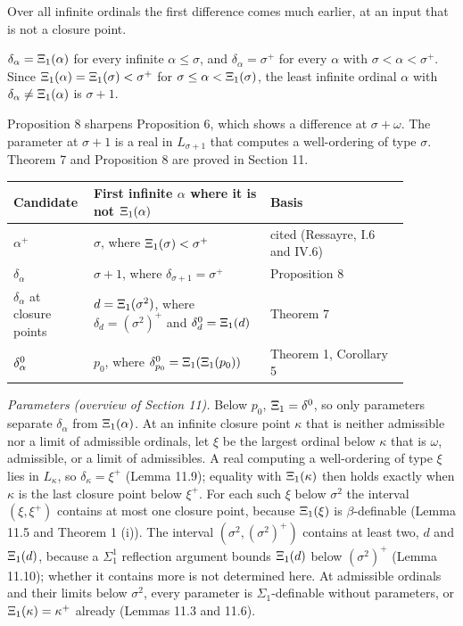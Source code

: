 \documentclass[11pt]{article}
\begin{document}
Over all infinite ordinals the first difference comes much earlier, at an input that is not a closure point.

\begin{statement} $\delta_{\alpha} = \Xi_1(\alpha)$ for every infinite $\alpha \le \sigma$, and
$\delta_{\alpha} = \sigma^+$ for every $\alpha$ with $\sigma < \alpha < \sigma^+$. Since
$\Xi_1(\alpha) = \Xi_1(\sigma) < \sigma^+$ for $\sigma \le \alpha < \Xi_1(\sigma)$, the least infinite ordinal $\alpha$
with $\delta_{\alpha} \ne \Xi_1(\alpha)$ is $\sigma + 1$.
\end{statement}

Proposition 8 sharpens Proposition 6, which shows a difference at $\sigma + \omega$. The parameter at $\sigma + 1$
is a real in $L_{\sigma + 1}$ that computes a well-ordering of type $\sigma$. Theorem 7 and Proposition 8 are
proved in Section 11.
\begin{center}\begin{tabular}{p{0.13\linewidth}p{0.42\linewidth}p{0.33\linewidth}}
\toprule
Candidate & First infinite $\alpha$ where it is not $\Xi_1(\alpha)$ & Basis \\
\midrule
$\alpha^+$ & $\sigma$, where $\Xi_1(\sigma) < \sigma^+$ & cited (Ressayre, I.6 and IV.6) \\
$\delta_{\alpha}$ & $\sigma + 1$, where $\delta_{\sigma+1} = \sigma^+$ & Proposition 8 \\
$\delta_{\alpha}$ at closure points & $d = \Xi_1(\sigma^2)$, where $\delta_d = (\sigma^2)^+$ and $\delta^0_{d} = \Xi_1(d)$ & Theorem 7 \\
$\delta^0_{\alpha}$ & $p_0$, where $\delta^0_{p_0} = \Xi_1(\Xi_1(p_0))$ & Theorem 1, Corollary 5 \\
\bottomrule
\end{tabular}\end{center}

\emph{Parameters (overview of Section 11).} Below $p_0$, $\Xi_1 = \delta^0_{}$, so only parameters separate $\delta_{\alpha}$ from $\Xi_1(\alpha)$.
At an infinite closure point $\kappa$ that is neither admissible nor a limit of admissible ordinals, let $\xi$ be
the largest ordinal below $\kappa$ that is $\omega$, admissible, or a limit of admissibles. A real computing a
well-ordering of type $\xi$ lies in $L_{\kappa}$, so $\delta_{\kappa} = \xi^+$ (Lemma 11.9); equality with
$\Xi_1(\kappa)$ then holds exactly when $\kappa$ is the last closure point below $\xi^+$. For each such $\xi$ below
$\sigma^2$ the interval $(\xi, \xi^+)$ contains at most one closure point, because $\Xi_1(\xi)$ is
$\beta$-definable (Lemma 11.5 and Theorem 1 (i)). The interval $(\sigma^2, (\sigma^2)^+)$ contains at least two, $d$ and $\Xi_1(d)$,
because a $\Sigma^1_1$ reflection argument bounds $\Xi_1(d)$ below $(\sigma^2)^+$ (Lemma 11.10); whether it contains
more is not determined here. At admissible
ordinals and their limits below $\sigma^2$, every parameter is $\Sigma_1$-definable without parameters, or
$\Xi_1(\kappa) = \kappa^+$ already (Lemmas 11.3 and 11.6).
\end{document}
